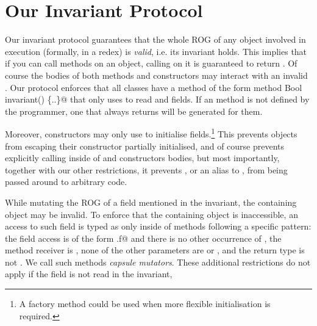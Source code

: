 \saveSpace
\section{Our Invariant Protocol}
\label{s:validate}
\saveSpace
Our invariant protocol guarantees that the whole ROG of any object involved in execution (formally, in a redex) is \emph{valid}, i.e. its invariant holds.
This implies that if you can call methods on an object, calling \Q@invariant@ on it is guaranteed to return \Q@true@.
Of course the bodies of both \Q@invariant@ methods and constructors may interact with an invalid \Q@this@.
Our protocol enforces that all classes have a method of the form \Q@read method Bool invariant() \{..\}@ that only uses \Q@this@ to read \Q@imm@ and \Q@capsule@ fields. If an \Q@invariant@ method is not defined by the programmer, one that always returns \Q@true@ will be generated for them.

Moreover, constructors may only use \Q@this@ to initialise fields.\footnote{A factory method could be used when more flexible initialisation is required.} This prevents objects from escaping their constructor partially initialised, and of course prevents explicitly calling \Q@invariant@ inside of \Q@invariants@ and constructors bodies, but most importantly, together with our other restrictions, it prevents \Q@this@, or an alias to \Q@this@, from being passed around to arbitrary code.

While mutating the ROG of a \Q@capsule@ field mentioned in the invariant, the containing object may be invalid.
To enforce that the containing object is inaccessible, an access to such field is typed as \Q@mut@ only inside of methods following a specific pattern: the field access is of the form \Q@this.f@ and there is no other occurrence of \Q@this@, the method receiver is \Q@mut@, none of the other parameters are \Q@mut@ or \Q@read@, and the return type is not \Q@mut@.
We call such methods \emph{capsule mutators}. These additional restrictions do not apply if the field is not read in the invariant,

